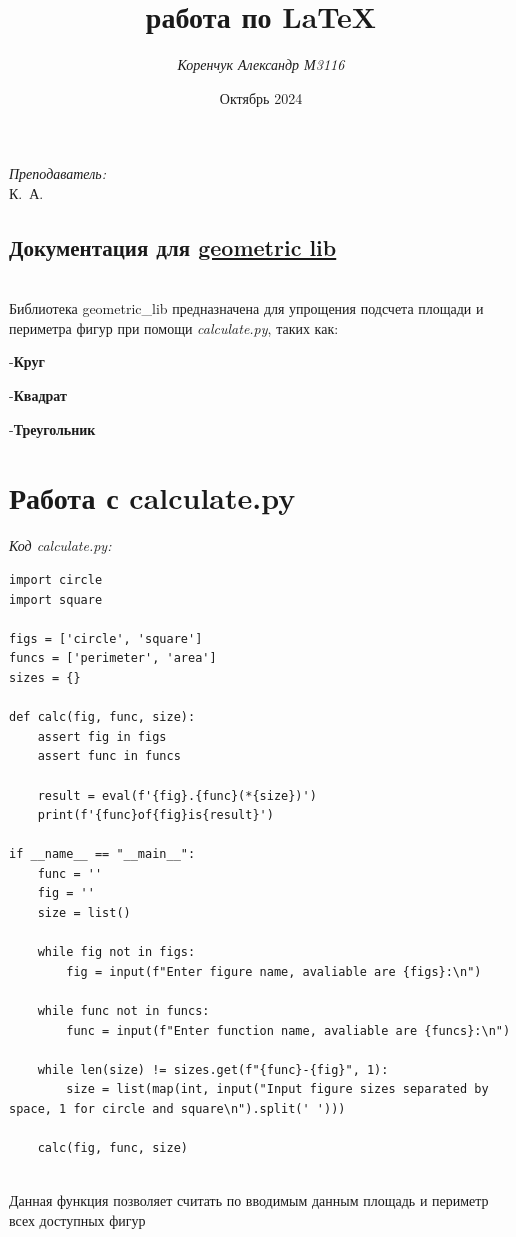 \documentclass[a4paper,30pt]{article}
\title{\huge \bfЛабораторная работа по \LaTeX}
\author{\textit{ Коренчук Александр М3116}}
\date{Октябрь 2024}
\begin{document}
\maketitle

    \begin{flushright} \large
    \emph{Преподаватель:}\\
    \quad\quad{} \textsc{К.~А.}
    \end{flushright}

\newpage
\begin{center}
    \section*{Документация для \href{https://github.com/smartiqaorg/geometric_lib}{geometric lib}}
\end{center}
\\
Библиотека geometric\_lib предназначена для упрощения подсчета площади и периметра фигур при помощи \textit{calculate.py}, таких как:

-\textbf{Круг}

-\textbf{Квадрат}

-\textbf{Треугольник}
\\
\section*{Работа с calculate.py}

\textit{Код calculate.py:}
\begin{lstlisting}
import circle
import square

figs = ['circle', 'square'] 
funcs = ['perimeter', 'area'] 
sizes = {} 

def calc(fig, func, size): 
	assert fig in figs 
	assert func in funcs

	result = eval(f'{fig}.{func}(*{size})') 
	print(f'{func}of{fig}is{result}') 

if __name__ == "__main__":
	func = ''
	fig = ''
	size = list()
    
	while fig not in figs:
		fig = input(f"Enter figure name, avaliable are {figs}:\n")
	
	while func not in funcs:
		func = input(f"Enter function name, avaliable are {funcs}:\n")
	
	while len(size) != sizes.get(f"{func}-{fig}", 1):
		size = list(map(int, input("Input figure sizes separated by space, 1 for circle and square\n").split(' ')))
	
	calc(fig, func, size)
\end{lstlisting}
\\
Данная функция позволяет считать по вводимым данным площадь и периметр всех доступных фигур
\newpage
\end{document}

